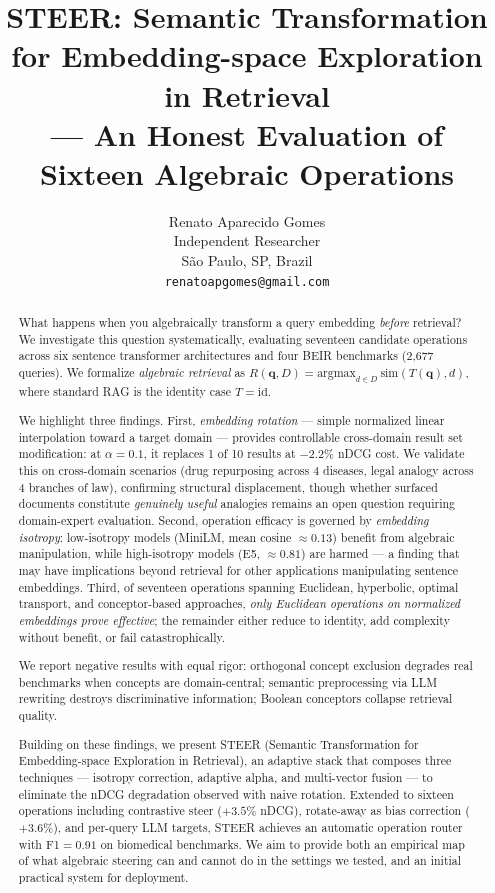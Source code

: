 \documentclass{article}
\title{STEER: Semantic Transformation for Embedding-space Exploration in Retrieval\\--- An Honest Evaluation of Sixteen Algebraic Operations}
\author{Renato Aparecido Gomes \\
Independent Researcher \\
S\~{a}o Paulo, SP, Brazil \\
\texttt{renatoapgomes@gmail.com}}
\date{}
\begin{document}
\maketitle

\begin{abstract}
What happens when you algebraically transform a query embedding \emph{before} retrieval? We investigate this question systematically, evaluating seventeen candidate operations across six sentence transformer architectures and four BEIR benchmarks (2,677 queries). We formalize \emph{algebraic retrieval} as $R(\mathbf{q}, D) = \text{argmax}_{d \in D} \ \text{sim}(T(\mathbf{q}), d)$, where standard RAG is the identity case $T = \text{id}$.

We highlight three findings. First, \emph{embedding rotation} --- simple normalized linear interpolation toward a target domain --- provides controllable cross-domain result set modification: at $\alpha = 0.1$, it replaces 1 of 10 results at $-2.2\%$ nDCG cost. We validate this on cross-domain scenarios (drug repurposing across 4 diseases, legal analogy across 4 branches of law), confirming structural displacement, though whether surfaced documents constitute \emph{genuinely useful} analogies remains an open question requiring domain-expert evaluation. Second, operation efficacy is governed by \emph{embedding isotropy}: low-isotropy models (MiniLM, mean cosine $\approx 0.13$) benefit from algebraic manipulation, while high-isotropy models (E5, $\approx 0.81$) are harmed --- a finding that may have implications beyond retrieval for other applications manipulating sentence embeddings. Third, of seventeen operations spanning Euclidean, hyperbolic, optimal transport, and conceptor-based approaches, \emph{only Euclidean operations on normalized embeddings prove effective}; the remainder either reduce to identity, add complexity without benefit, or fail catastrophically.

We report negative results with equal rigor: orthogonal concept exclusion degrades real benchmarks when concepts are domain-central; semantic preprocessing via LLM rewriting destroys discriminative information; Boolean conceptors collapse retrieval quality.

Building on these findings, we present STEER (Semantic Transformation for Embedding-space Exploration in Retrieval), an adaptive stack that composes three techniques --- isotropy correction, adaptive alpha, and multi-vector fusion --- to eliminate the nDCG degradation observed with naive rotation. Extended to sixteen operations including contrastive steer ($+3.5\%$ nDCG), rotate-away as bias correction ($+3.6\%$), and per-query LLM targets, STEER achieves an automatic operation router with F1$=0.91$ on biomedical benchmarks. We aim to provide both an empirical map of what algebraic steering can and cannot do in the settings we tested, and an initial practical system for deployment.
\end{abstract}
\end{document}
